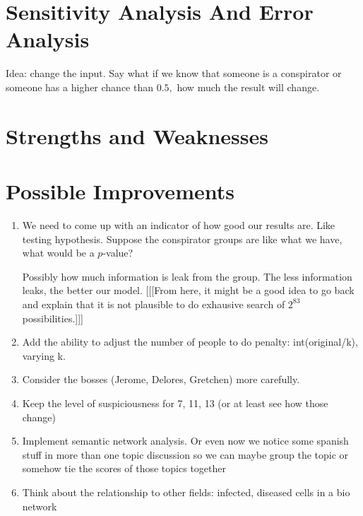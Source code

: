 \documentclass{icmmcm}
\begin{document}

\section{Sensitivity Analysis And Error Analysis}
Idea: change the input. Say what if we know that someone is a conspirator
or someone has a higher chance than $0.5,$
how much the result will change.
\section{Strengths and Weaknesses}

\section{Possible Improvements}
\begin{enumerate}
\item We need to come up with an indicator of how good our results are.
Like testing hypothesis. Suppose the conspirator groups are 
like what we have, what would be a $p$-value?

Possibly how much information is leak from the group.
The less information leaks, the better our model.
 [[[From here, it might be a good idea to go back
and explain that it is not plausible to do exhausive search of
$2^{83}$ possibilities.]]]
\item Add the ability to adjust the number of people to do penalty: int(original/k), varying k.
\item Consider the bosses (Jerome, Delores, Gretchen) more carefully.
\item Keep the level of suspiciousness for 7, 11, 13 (or at least see how those change)
\item Implement semantic network analysis. 
	Or even now we notice some spanish stuff in more than one topic discussion
	so we can maybe group the topic or somehow tie the scores of those topics together
\item Think about the relationship to other fields: infected, diseased cells in a bio network
\end{enumerate}
		
\end{document}
